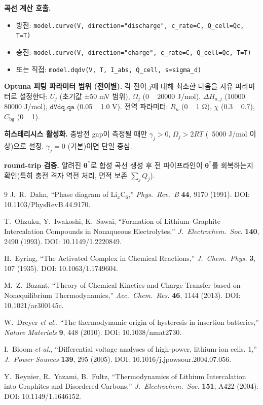 \documentclass[11pt,a4paper]{article}
\newcommand{\bg}{\mathrm{bg}}
\begin{document}
\textbf{곡선 계산 호출.}
\begin{itemize}[leftmargin=1.8em,itemsep=1pt]
\item 방전: \texttt{model.curve(V, direction="discharge", c\_rate=C, Q\_cell=Qc, T=T)}
\item 충전: \texttt{model.curve(V, direction="charge", c\_rate=C, Q\_cell=Qc, T=T)}
\item 또는 직접: \texttt{model.dqdv(V, T, I\_abs, Q\_cell, s=sigma\_d)}
\end{itemize}

\textbf{Optuna 피팅 파라미터 범위 (전이별).}
각 전이 $j$에 대해 최소한 다음을 자유 파라미터로 설정한다:
$U_j$ (초기값 ±50 mV 범위),
$\Omega_j$ (0 ~ 20000 J/mol),
$\Delta H_{a,j}$ (10000 ~ 80000 J/mol),
$\texttt{dVdq\_qa}$ (0.05 ~ 1.0 V).
전역 파라미터: $R_n$ (0 ~ 1 Ω), $\chi$ (0.3 ~ 0.7), $C_\bg$ (0 ~ 1).

\textbf{히스테리시스 활성화.}
충방전 gap이 측정될 때만 $\gamma_j > 0$, $\Omega_j > 2RT$ (~5000 J/mol 이상)으로 설정.
$\gamma_j=0$ (기본)이면 단일 중심.

\textbf{round-trip 검증.}
알려진 $\boldsymbol{\theta}^*$로 합성 곡선 생성 후 전 파이프라인이 $\boldsymbol{\theta}^*$를
회복하는지 확인(특히 충전 격자 역전 처리, 면적 보존 $\sum_j Q_j$).

\begin{thebibliography}{9}
J.~R.~Dahn, ``Phase diagram of $\mathrm{Li}_x\mathrm{C}_6$,''
\emph{Phys.\ Rev.\ B} \textbf{44}, 9170 (1991).
DOI: 10.1103/PhysRevB.44.9170.

T.~Ohzuku, Y.~Iwakoshi, K.~Sawai,
``Formation of Lithium--Graphite Intercalation Compounds in Nonaqueous Electrolytes,''
\emph{J.\ Electrochem.\ Soc.} \textbf{140}, 2490 (1993).
DOI: 10.1149/1.2220849.

H.~Eyring, ``The Activated Complex in Chemical Reactions,''
\emph{J.\ Chem.\ Phys.} \textbf{3}, 107 (1935).
DOI: 10.1063/1.1749604.

M.~Z.~Bazant,
``Theory of Chemical Kinetics and Charge Transfer based on Nonequilibrium Thermodynamics,''
\emph{Acc.\ Chem.\ Res.} \textbf{46}, 1144 (2013).
DOI: 10.1021/ar300145c.

W.~Dreyer \emph{et al.},
``The thermodynamic origin of hysteresis in insertion batteries,''
\emph{Nature Materials} \textbf{9}, 448 (2010).
DOI: 10.1038/nmat2730.

I.~Bloom \emph{et al.},
``Differential voltage analyses of high-power, lithium-ion cells. 1,''
\emph{J.\ Power Sources} \textbf{139}, 295 (2005).
DOI: 10.1016/j.jpowsour.2004.07.056.

Y.~Reynier, R.~Yazami, B.~Fultz,
``Thermodynamics of Lithium Intercalation into Graphites and Disordered Carbons,''
\emph{J.\ Electrochem.\ Soc.} \textbf{151}, A422 (2004).
DOI: 10.1149/1.1646152.
\end{thebibliography}
\end{document}

